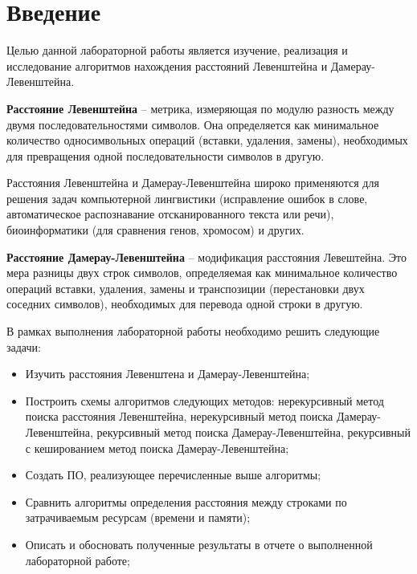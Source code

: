 \chapter*{Введение}

Целью данной лабораторной работы является изучение, реализация и исследование алгоритмов нахождения расстояний Левенштейна и Дамерау-Левенштейна.

\bigskip

\textbf{Расстояние Левенштейна} -- метрика, измеряющая по модулю разность между двумя последовательностями символов. Она определяется как минимальное количество односимвольных операций (вставки, удаления, замены), необходимых для превращения одной последовательности символов в другую.

\bigskip

Расстояния Левенштейна и  Дамерау-Левенштейна широко применяются для решения задач компьютерной лингвистики (исправление ошибок в слове, автоматическое распознавание отсканированного текста или речи), биоинформатики (для сравнения генов, хромосом) и других.

\textbf{Расстояние Дамерау-Левенштейна} -- модификация расстояния Левештейна. Это мера разницы двух строк символов, определяемая как минимальное количество операций вставки, удаления, замены и транспозиции (перестановки двух соседних символов), необходимых для перевода одной строки в другую.

\bigskip

В рамках выполнения лабораторной работы необходимо решить следующие задачи:

\begin{itemize}
	\item Изучить расстояния Левенштена и Дамерау-Левенштейна;
	\item Построить схемы алгоритмов следующих методов: нерекурсивный метод поиска расстояния Левенштейна, нерекурсивный метод поиска Дамерау-Левенштейна, рекурсивный метод поиска Дамерау-Левенштейна, рекурсивный с кешированием метод поиска Дамерау-Левенштейна;
	\item Создать ПО, реализующее перечисленные выше алгоритмы;
	\item Сравнить алгоритмы определения расстояния между строками по затрачиваемым ресурсам (времени и памяти);
	\item Описать и обосновать полученные результаты в отчете о выполненной лабораторной работе;
\end{itemize}
